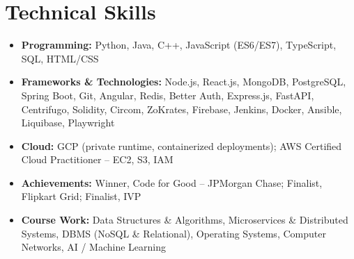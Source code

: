 \documentclass[a4paper,11pt]{article}
\newcommand{\resumeItem}[2]{
  \item{\textbf{#1}{\hspace{0.5mm}#2 \vspace{-0.5mm}}}
}
\newcommand{\resumeSubItem}[2]{\resumeItem{#1}{#2}\vspace{-7pt}}
\newcommand{\resumeHeadingSkillStart}{\begin{itemize}[leftmargin=*,itemsep=0.6mm, rightmargin=2ex]}
\newcommand{\resumeHeadingSkillEnd}{\end{itemize}\vspace{-2mm}}
\begin{document}
\section{\textbf{Technical Skills}}
\vspace{-0.4mm}
\resumeHeadingSkillStart
  \resumeSubItem{Programming: }
    {Python, Java, C++, JavaScript (ES6/ES7), TypeScript, SQL, HTML/CSS}
  \resumeSubItem{Frameworks \& Technologies: }
    {Node.js, React.js, MongoDB, PostgreSQL, Spring Boot, Git, Angular, Redis, Better Auth, Express.js, FastAPI, Centrifugo, Solidity, Circom, ZoKrates, Firebase, Jenkins, Docker, Ansible, Liquibase, Playwright}
  \resumeSubItem{Cloud: }
  {GCP (private runtime, containerized deployments); AWS Certified Cloud Practitioner -- EC2, S3, IAM}
  \resumeSubItem{Achievements: }
    {Winner, Code for Good -- JPMorgan Chase; Finalist, Flipkart Grid; Finalist, IVP}
  \resumeSubItem{Course Work: }
    {Data Structures \& Algorithms, Microservices \& Distributed Systems, DBMS (NoSQL \& Relational), Operating Systems, Computer Networks, AI / Machine Learning}
\resumeHeadingSkillEnd
\end{document}
